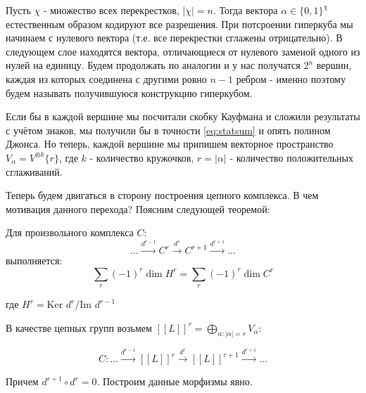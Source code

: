 \documentclass[a4paper,8pt]{extarticle}
\begin{document}
\begin{multicols}{2}
    Пусть $\chi$ - множество всех перекрестков, $|\chi| = n$. Тогда вектора $\alpha \in
    \{0,1\}^\chi$ естественным образом кодируют все разрешения. При
    потсроении гиперкуба мы начинаем с нулевого вектора (т.е. все
    перекрестки сглажены отрицательно). В следующем слое находятся
    вектора, отличающиеся от нулевого заменой одного из нулей на
    единицу. Будем продолжать по аналогии и у нас получатся $2^n$
    вершин, каждая из которых соединена с другими ровно $n-1$ ребром - 
    именно поэтому будем называть получившуюся конструкцию гиперкубом.

    Если бы в каждой вершине мы посчитали скобку Кауфмана
    и сложили результаты с учётом знаков, мы получили бы в точности
    \eqref{eq:statsum} и опять полином Джонса. Но теперь, каждой
    вершине мы припишем векторное пространство $V_\alpha = V^{\otimes k}\{r\}$,
    где $k$ - количество кружочков, $r=|\alpha|$ - количество положительных
    сглаживаний.

    Теперь будем двигаться в сторону построения цепного комплекса.
    В чем мотивация данного перехода? Поясним следующей теоремой:

    \begin{tcolorbox}
        \begin{theorem}
        Для произвольного комплекса $C$:
        \begin{equation}
            \ldots \xrightarrow{d^{r-1}} C^r \xrightarrow{d^{r}}
            C^{r+1} \xrightarrow{d^{r+1}} \ldots
        \end{equation} 
        выполняется:
        \begin{equation}
            \sum_r (-1)^r \dim H^r = \sum_r (-1)^r \dim C^r
        \end{equation}

        где $H^r = \text{Ker } d^r / \text{Im } d^{r-1}$
    \end{theorem}
    \end{tcolorbox}
    

    В качестве цепных групп возьмем $[\![ L ]\!]^r = \bigoplus_{\alpha: |\alpha|=r} V_\alpha$:

    \begin{equation}
        C: \ldots \xrightarrow{d^{r-1}} [\![ L ]\!]^r \xrightarrow{d^{r}} 
        [\![ L ]\!]^{r+1} \xrightarrow{d^{r+1}} \ldots
        \label{eq:complex-gen}
    \end{equation}

    Причем $d^{r+1} \circ d^{r} = 0$. Построим данные морфизмы явно.
    

\end{multicols}
\end{document}
